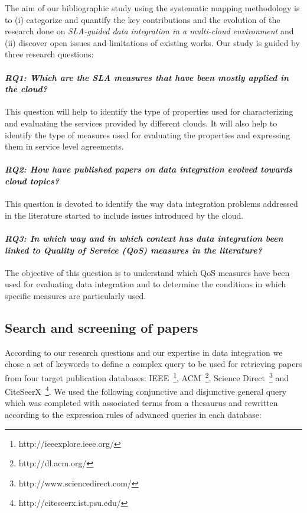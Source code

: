 
The aim of our bibliographic study using the systematic mapping methodology \cite{SM:Petersen:2008} is to (i) categorize and quantify the key contributions and the evolution of the research done on \textit{SLA-guided
data integration in a multi-cloud environment} and  (ii) discover open issues and limitations of existing works.    
Our study is guided by  three research questions:


\paragraph{\textit{\textbf{RQ1:} Which are the SLA measures that have been mostly
applied  in the cloud?}} This question will help  to identify  the type of properties used for characterizing and evaluating the services provided  by different clouds. It will also help to identify  the type of measures used for evaluating the properties and expressing them in service level agreements.

\paragraph{\textit{\textbf{RQ2:}  How have published papers on data
 integration evolved towards cloud topics?}} This question is devoted to identify the way  data integration problems addressed in the literature started  to include issues introduced by the cloud.

\paragraph{\textit{\textbf{RQ3:} In which way and in which  context has data integration  been linked to Quality of Service (QoS) measures in the literature?}} The objective of this question is to understand which QoS measures have been used for evaluating data integration and to determine the conditions in which  specific measures are particularly used.

\subsection{Search and screening of papers} \label{subsec:search}

According to our research questions and our expertise in data integration we chose a set of keywords to define a complex query to be used for retrieving papers from four target publication databases: IEEE~\footnote{http://ieeexplore.ieee.org/},
ACM~\footnote{http://dl.acm.org/}, Science Direct~\footnote{http://www.sciencedirect.com/} and
CiteSeerX~\footnote{http://citeseerx.ist.psu.edu/}. We used the following conjunctive and disjunctive general query which was completed with associated terms from a thesaurus and rewritten according to the expression rules of advanced queries in each database: 




